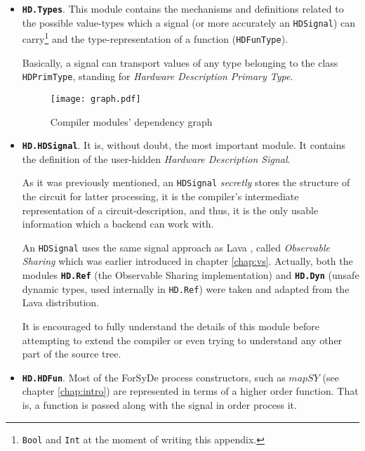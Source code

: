 \begin{itemize}
\item \texttt{\textbf{HD.Types}}. This module contains the mechanisms
  and definitions related to the possible value-types which a signal
  (or more accurately an \texttt{HDSignal}) can
  carry\footnote{\texttt{Bool} and \texttt{Int} at the moment of
    writing this appendix.} and the type-representation of a function
  (\texttt{HDFunType}). 

  Basically, a signal can transport values of any type belonging to
  the class \texttt{HDPrimType}, standing for \textit{Hardware
    Description Primary Type}.


\begin{landscape}
\begin{figure}
\centering
\texttt{[image: graph.pdf]}
  \caption{Compiler modules' dependency graph}
  \label{fig:graph}
\end{figure}
\end{landscape}


\item \texttt{\textbf{HD.HDSignal}}. It is, without doubt, the most important
  module. It contains the definition of the user-hidden
  \textit{Hardware Description Signal}. 


  
  As it was previously mentioned, an \texttt{HDSignal}
  \textit{secretly} stores the structure of the circuit for latter
  processing, it is the compiler's intermediate representation of a
  circuit-description, and thus, it is the only usable information
  which a backend can work with.

  An \texttt{HDSignal} uses the same signal approach as
  Lava \cite{lava}, called \textit{Observable Sharing} \cite{osharing}
  which was earlier introduced in chapter \ref{chap:vs}.  Actually,
  both the modules \texttt{\textbf{HD.Ref}} (the Observable Sharing
  implementation) and \texttt{\textbf{HD.Dyn}} (unsafe dynamic types,
  used internally in \texttt{HD.Ref}) were taken and adapted from the
  Lava distribution.

  It is encouraged to fully understand the details of this module before
  attempting to extend the compiler or even trying to understand any other
  part of the source tree.

\item \texttt{\textbf{HD.HDFun}}. Most of the ForSyDe process
  constructors, such as $\mathit{mapSY}$ (see chapter
  \ref{chap:intro}) are represented in terms of a higher order
  function. That is, a function is passed along with the signal in
  order process it.
  

\end{itemize}
